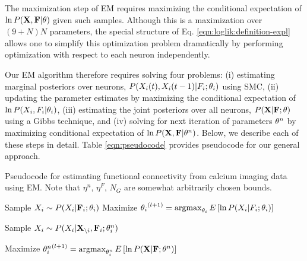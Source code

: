 The maximization step of EM requires maximizing the conditional expectation of $\ln P({\bf X}, {\bf F} | \mathbf{\theta})$ given such samples. Although this is a maximization over $(9+N)N$ parameters, the special structure of Eq. \eqref{eqn:loglik:definition-expl} allows one to simplify this optimization problem dramatically by performing optimization with respect to each neuron independently.  

Our EM algorithm therefore requires solving four problems: (i) estimating marginal posteriors over neurons, $P(X_i(t), X_i(t-1) | F_i; \mathbf{\theta}_i)$ using SMC, (ii) updating the parameter estimates by maximizing the conditional expectation of $\ln P(X_i, F_i | \mathbf{\theta}_i)$,  (iii) estimating the joint posteriors over all neurons,  $P({\bf X}| {\bf F}; \mathbf{\theta})$ using a Gibbs technique, and (iv) solving for next iteration of parameters $\mathbf{\theta}^n$ by maximizing conditional expectation of  $\ln P({\bf X}, {\bf F}| \mathbf{\theta}^n)$.  Below, we describe each of these steps in detail. Table \ref{eqn:pseudocode} provides pseudocode for our general approach.  

\begin{algorithm}
\caption{Pseudocode for estimating functional connectivity from calcium imaging data using EM. Note that $\eta^n$, $\eta^F$, $N_G$ are somewhat arbitrarily chosen bounds.}
\label{eqn:pseudocode}
\begin{algorithmic}
      \State Sample $X_i \sim P(X_i|{\bf F}_i; \mathbf{\theta}_i)$
      \State Maximize ${\mathbf{\theta}_i}^{(l+1)}=\operatorname*{argmax}_{\mathbf{\theta}_i} E\left[\ln P(X_i | F_i; \mathbf{\theta}_i) \right]$
    \EndWhile
  \EndFor
  
      \State Sample $X_i \sim P(X_i|{\bf X}_{\backslash i},{\bf F}_i; \mathbf{\theta}^n_i)$
    \EndFor
  \EndFor 

  \State Maximize ${\mathbf{\theta}^n_i}^{(l+1)}=\operatorname*{argmax}_{\mathbf{\theta}^n_i} E\left[\ln P({\bf X} | {\bf F}; \mathbf{\theta}^n)\right]$  
\EndWhile
\end{algorithmic}
\end{algorithm}

